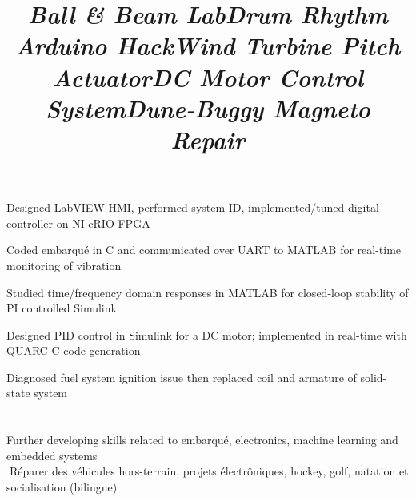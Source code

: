 \documentclass[mm]{res}
\begin{document}
\begin{resume}
\title{\textsl{Ball \& Beam Lab}}
\begin{position}
\tb Designed LabVIEW HMI, performed system ID, implemented/tuned digital controller on NI cRIO FPGA
\end{position}

\title{\textsl{Drum Rhythm Arduino Hack}}
\begin{position}
\tb Coded embarqu\'e in C and communicated over UART to MATLAB for real-time monitoring of vibration
\end{position}

\title{\textsl{Wind Turbine Pitch Actuator}}
\begin{position}
\tb Studied time/frequency domain responses in MATLAB for closed-loop stability of PI controlled Simulink
\end{position}


\title{\textsl{DC Motor Control System}}
\begin{position}
\tb Designed PID control in Simulink for a DC motor; implemented in real-time with QUARC C code generation
\end{position}


\title{\textsl{Dune-Buggy Magneto Repair}}
\begin{position}
\tb Diagnosed fuel system ignition issue then replaced coil and armature of solid-state system
\end{position}


\toprule

\section{\headinginterests}
\tb Further developing skills related to embarqu\'e, electronics, machine learning and embedded systems\\
􏰚\tb R\'eparer des v\'ehicules hors-terrain, projets \'electr\^oniques, hockey, golf, natation et socialisation (bilingue)

\end{resume}
\end{document}
